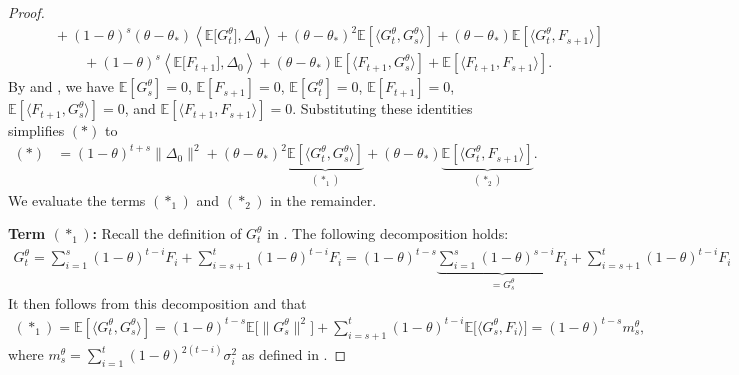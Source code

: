\documentclass[10pt,a4paper]{amsart}
\newcommand{\E}{\mathbb E}
\begin{document}
\begin{proof}
\begin{align}
    & \hspace{25pt} + (1-\theta)^s (\theta - \theta_*) \left\langle \E\big[ G_t^\theta \big], \Delta_0 \right\rangle + (\theta - \theta_*)^2 \E\left[ \langle G_t^\theta, G_s^\theta \rangle \right] + (\theta - \theta_*) \E\left[ \langle G_t^\theta, F_{s+1} \rangle \right] \\
    & \hspace{50pt} + (1-\theta)^{s} \left\langle \E\big[ F_{t+1} \big], \Delta_0 \right \rangle + (\theta - \theta_*) \E\left[ \langle F_{t+1}, G_s^\theta \rangle \right] + \E\left[ \langle F_{t+1}, F_{s+1} \rangle \right] .
\end{align}
By  and , we have $\E[ G_s^\theta ] = 0$, $\E[ F_{s+1} ] = 0$, $\E[ G_t^\theta ] = 0$, $\E[ F_{t+1} ] = 0$, $\E[ \langle F_{t+1}, G_s^\theta \rangle ] = 0$, and $\E[ \langle F_{t+1}, F_{s+1} \rangle ] = 0$.
Substituting these identities simplifies $(*)$ to
\begin{align}
    (*) & = (1-\theta)^{t+s}\|\Delta_0\|^2 + (\theta - \theta_*)^2 \underbrace{ \E\left[ \langle G_t^\theta, G_s^\theta \rangle \right] }_{ (*_1) } + (\theta - \theta_*) \underbrace{ \E\left[ \langle G_t^\theta, F_{s+1} \rangle \right] }_{ (*_2) } . \label{eq:autocovariance_decomp}
\end{align}
We evaluate the terms $(*_1)$ and $(*_2)$ in the remainder.

\vspace{5pt}
\noindent
\textbf{Term $(*_1)$:}
Recall the definition of $G_t^\theta$ in .
The following decomposition holds:
\begin{align}
    G_t^\theta = \sum_{i=1}^{s} (1-\theta)^{t-i} F_i + \sum_{i=s+1}^{t} (1-\theta)^{t-i}F_i = (1-\theta)^{t-s} \underbrace{ \sum_{i=1}^s (1-\theta)^{s-i} F_i }_{ = G_s^\theta } + \sum_{i=s+1}^t (1-\theta)^{t-i} F_i
\end{align}
It then follows from this decomposition and  that
\begin{align}
    (*_1) = \E\left[ \langle G_t^\theta, G_s^\theta \rangle \right] = (1 - \theta)^{t-s} \E\big[ \| G_s^\theta \|^2 \big] + \sum_{i=s+1}^t (1 - \theta)^{t-i} \E\big[ \langle G_s^\theta, F_i \rangle \big] = (1-\theta)^{t-s} m_s^\theta ,
\end{align}
where $m_s^\theta = \sum_{i=1}^{t} (1 - \theta)^{2(t-i)} \sigma_i^2$ as defined in .


\end{proof}
\end{document}
